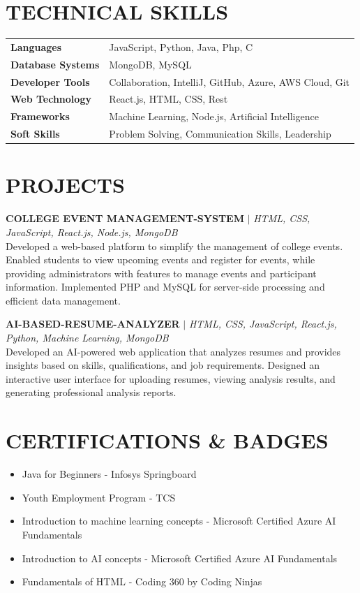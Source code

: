 \documentclass[9.5pt,a4paper]{extarticle}
\begin{document}
\section*{TECHNICAL SKILLS}
\begin{tabular}{@{}p{1.5in}p{5.4in}@{}}
\textbf{Languages} & JavaScript, Python, Java, Php, C \\
\textbf{Database Systems} & MongoDB, MySQL \\
\textbf{Developer Tools} & Collaboration, IntelliJ, GitHub, Azure, AWS Cloud, Git \\
\textbf{Web Technology} & React.js, HTML, CSS, Rest \\
\textbf{Frameworks} & Machine Learning, Node.js, Artificial Intelligence \\
\textbf{Soft Skills} & Problem Solving, Communication Skills, Leadership \\
\end{tabular}

\section*{PROJECTS}
\noindent \textbf{COLLEGE EVENT MANAGEMENT-SYSTEM} $|$ \textit{HTML, CSS, JavaScript, React.js, Node.js, MongoDB} \\
Developed a web-based platform to simplify the management of college events. Enabled students to view upcoming events and register for events, while providing administrators with features to manage events and participant information. Implemented PHP and MySQL for server-side processing and efficient data management. \vspace{4pt}

\noindent \textbf{AI-BASED-RESUME-ANALYZER} $|$ \textit{HTML, CSS, JavaScript, React.js, Python, Machine Learning, MongoDB} \\
Developed an AI-powered web application that analyzes resumes and provides insights based on skills, qualifications, and job requirements. Designed an interactive user interface for uploading resumes, viewing analysis results, and generating professional analysis reports. \vspace{4pt}


\section*{CERTIFICATIONS \& BADGES}
\begin{itemize}[leftmargin=0.2in, itemsep=1pt, topsep=1pt]
    \item Java for Beginners - Infosys Springboard
    \item Youth Employment Program - TCS
    \item Introduction to machine learning concepts - Microsoft Certified Azure AI Fundamentals
    \item Introduction to AI concepts - Microsoft Certified Azure AI Fundamentals
    \item Fundamentals of HTML - Coding 360 by Coding Ninjas
\end{itemize}
\end{document}

